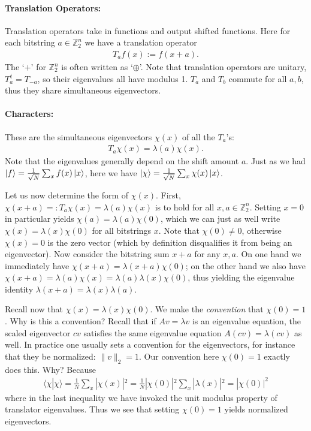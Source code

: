 \paragraph{Translation Operators:} Translation operators take in functions and output shifted functions. Here for each bitstring $a \in \mathbb{Z}_2^n$ we have a translation operator
\begin{align*}
    T_af(x) := f(x+a).
\end{align*}
The `$+$' for $\mathbb{Z}_2^n$ is often written as `$\oplus$'. Note that translation operators are unitary, $T_a^\dag = T_{-a}$, so their eigenvalues all have modulus 1. $T_a$ and $T_b$ commute for all $a,b$, thus they share simultaneous eigenvectors.

\paragraph{Characters:} These are the simultaneous eigenvectors ${\chi(x)}$ of all the $T_a$'s:
\begin{align*}
    T_a\chi(x) = \lambda(a)\chi(x).
\end{align*}
Note that the eigenvalues generally depend on the shift amount $a$. Just as we had $\ket{f} = \frac{1}{\sqrt{N}} \sum_x f(x)\ket{x}$, here we have $\ket{\chi} = \frac{1}{\sqrt{N}} \sum_x \chi(x)\ket{x}$.

Let us now determine the form of $\chi(x)$. First, $\chi(x+a) =: T_a\chi(x) = \lambda(a)\chi(x)$ is to hold for all $x,a \in \mathbb{Z}_2^n$. Setting $x=0$ in particular yields $\chi(a)=\lambda(a)\chi(0)$, which we can just as well write $\chi(x)=\lambda(x)\chi(0)$ for all bitstrings $x$. Note that $\chi(0) \neq 0$, otherwise $\chi(x)=0$ is the zero vector (which by definition disqualifies it from being an eigenvector). Now consider the bitstring sum $x+a$ for any $x,a$. On one hand we immediately have $\chi(x+a)=\lambda(x+a)\chi(0)$; on the other hand we also have $\chi(x+a)=\lambda(a)\chi(x)=\lambda(a)\lambda(x)\chi(0)$, thus yielding the eigenvalue identity $\lambda(x+a)=\lambda(x)\lambda(a)$.

Recall now that $\chi(x)=\lambda(x)\chi(0)$. We make the \textit{convention} that $\chi(0)=1$. Why is this a convention? Recall that if $Av=\lambda v$ is an eigenvalue equation, the scaled eigenvector $cv$ satisfies the same eigenvalue equation $A(cv)=\lambda(cv)$ as well. In practice one usually sets a convention for the eigenvectors, for instance that they be normalized: $\|v\|_2=1$. Our convention here $\chi(0)=1$ exactly does this. Why? Because
\begin{align*}
    \langle \chi|\chi \rangle = \frac{1}{N} \sum_x |\chi(x)|^2 = \frac{1}{N}|\chi(0)|^2 \sum_x |\lambda(x)|^2 = |\chi(0)|^2
\end{align*}
where in the last inequality we have invoked the unit modulus property of translator eigenvalues. Thus we see that setting $\chi(0)=1$ yields normalized eigenvectors.

